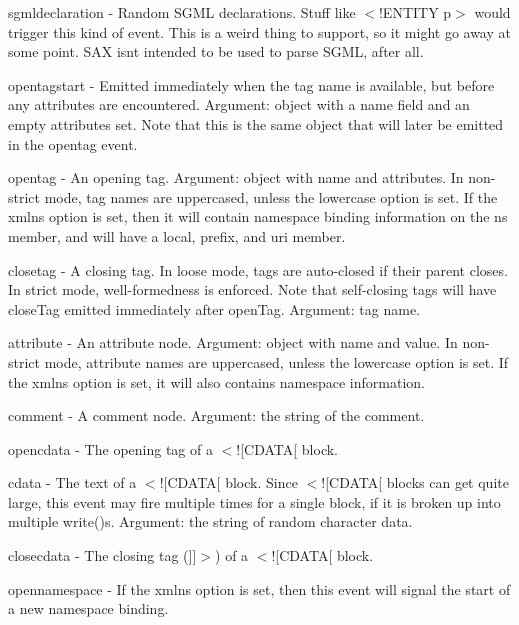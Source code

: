 {\ttfamily sgmldeclaration} -\/ Random S\+G\+ML declarations. Stuff like {\ttfamily $<$!\+E\+N\+T\+I\+TY p$>$} would trigger this kind of event. This is a weird thing to support, so it might go away at some point. S\+AX isn\textquotesingle{}t intended to be used to parse S\+G\+ML, after all.

{\ttfamily opentagstart} -\/ Emitted immediately when the tag name is available, but before any attributes are encountered. Argument\+: object with a {\ttfamily name} field and an empty {\ttfamily attributes} set. Note that this is the same object that will later be emitted in the {\ttfamily opentag} event.

{\ttfamily opentag} -\/ An opening tag. Argument\+: object with {\ttfamily name} and {\ttfamily attributes}. In non-\/strict mode, tag names are uppercased, unless the {\ttfamily lowercase} option is set. If the {\ttfamily xmlns} option is set, then it will contain namespace binding information on the {\ttfamily ns} member, and will have a {\ttfamily local}, {\ttfamily prefix}, and {\ttfamily uri} member.

{\ttfamily closetag} -\/ A closing tag. In loose mode, tags are auto-\/closed if their parent closes. In strict mode, well-\/formedness is enforced. Note that self-\/closing tags will have {\ttfamily close\+Tag} emitted immediately after {\ttfamily open\+Tag}. Argument\+: tag name.

{\ttfamily attribute} -\/ An attribute node. Argument\+: object with {\ttfamily name} and {\ttfamily value}. In non-\/strict mode, attribute names are uppercased, unless the {\ttfamily lowercase} option is set. If the {\ttfamily xmlns} option is set, it will also contains namespace information.

{\ttfamily comment} -\/ A comment node. Argument\+: the string of the comment.

{\ttfamily opencdata} -\/ The opening tag of a {\ttfamily $<$!\mbox{[}C\+D\+A\+TA\mbox{[}} block.

{\ttfamily cdata} -\/ The text of a {\ttfamily $<$!\mbox{[}C\+D\+A\+TA\mbox{[}} block. Since {\ttfamily $<$!\mbox{[}C\+D\+A\+TA\mbox{[}} blocks can get quite large, this event may fire multiple times for a single block, if it is broken up into multiple {\ttfamily write()}s. Argument\+: the string of random character data.

{\ttfamily closecdata} -\/ The closing tag ({\ttfamily \mbox{]}\mbox{]}$>$}) of a {\ttfamily $<$!\mbox{[}C\+D\+A\+TA\mbox{[}} block.

{\ttfamily opennamespace} -\/ If the {\ttfamily xmlns} option is set, then this event will signal the start of a new namespace binding.

